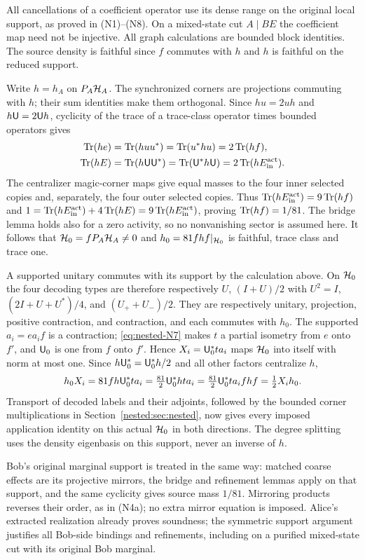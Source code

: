 All cancellations of a coefficient operator use its dense range on the
original local support, as proved in (N1)--(N8). On a mixed-state cut
$A\mid BE$ the coefficient map need not be injective. All graph calculations are
bounded block identities. The source density is faithful since $f$ commutes with $h$ and
$h$ is faithful on the reduced support.

Write $h=h_A$ on $P_A\mathcal H_A$. The synchronized
corners are projections commuting with $h$; their sum identities
make them orthogonal. Since $hu=2uh$ and $h{\mathsf U}=2{\mathsf U}h$, cyclicity of the
trace of a trace-class operator times bounded operators gives
\[
 \begin{aligned}\operatorname{Tr}(he)&=\operatorname{Tr}(huu^*)=\operatorname{Tr}(u^*hu)=2\operatorname{Tr}(hf),\\
 \operatorname{Tr}(hE)&=\operatorname{Tr}(h{\mathsf U}{\mathsf U}^*)=\operatorname{Tr}({\mathsf U}^*h{\mathsf U})=2\operatorname{Tr}(h{E^{\rm act}_{\rm in}}).\end{aligned}
\]
The centralizer magic-corner maps give equal masses to the four
inner selected copies and, separately, the four outer selected
copies. Thus $\operatorname{Tr}(h{E^{\rm act}_{\rm in}})=9\operatorname{Tr}(hf)$ and
$1=\operatorname{Tr}(h{E^{\rm act}_{\rm in}})+4\operatorname{Tr}(hE)=9\operatorname{Tr}(h{E^{\rm act}_{\rm in}})$, proving $\operatorname{Tr}(hf)=1/81$.
The bridge lemma holds also for a zero activity, so no nonvanishing sector
is assumed here. It follows that $\mathcal H_0=fP_A\mathcal H_A\ne0$ and
$h_0=81fhf|_{\mathcal H_0}$ is faithful, trace class and trace one.

A supported unitary commutes with its support by the calculation
above. On $\mathcal H_0$ the four decoding types are therefore respectively
$U$, $(I+U)/2$ with $U^2=I$, $(2I+U+U^*)/4$, and
$(U_++U_-)/2$. They are respectively unitary, projection, positive
contraction, and contraction, and each commutes with $h_0$.
The supported $a_i=e a_i f$ is a contraction; \eqref{eq:nested-N7} makes $t$ a
partial isometry from $e$ onto $f'$, and ${\mathsf U}_0$ is one from $f$ onto
$f'$. Hence $X_i={\mathsf U}_0^*ta_i$ maps $\mathcal H_0$ into itself with norm at
most one. Since $h{\mathsf U}_0^*={\mathsf U}_0^*h/2$ and all other factors centralize $h$,
\[
 h_0X_i=81fh{\mathsf U}_0^*ta_i
 =\tfrac{81}{2}{\mathsf U}_0^*hta_i
 =\tfrac{81}{2}{\mathsf U}_0^*ta_ifhf=\tfrac12X_ih_0.
\]
Transport of decoded labels and their adjoints, followed by the
bounded corner multiplications in Section~\ref{nested:sec:nested}, now gives every
imposed application identity on this actual $\mathcal H_0$ in both
directions. The degree splitting uses the density eigenbasis on
this support, never an inverse of $h$.

Bob's original marginal support is treated in the same way: matched
coarse effects are its projective mirrors, the bridge and refinement
lemmas apply on that support, and the same cyclicity gives source
mass $1/81$. Mirroring products reverses their order, as in (N4a);
no extra mirror equation is imposed. Alice's extracted realization
already proves soundness; the symmetric support argument justifies
all Bob-side bindings and refinements, including on a purified
mixed-state cut with its original Bob marginal.

